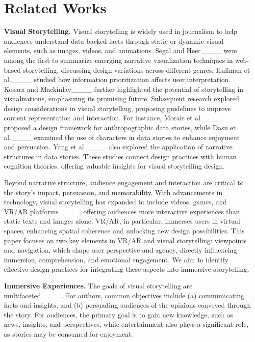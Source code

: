 \section{Related Works}
\noindent\textbf{Visual Storytelling.}
Visual storytelling is widely used in journalism to help audiences understand data-backed facts through static or dynamic visual elements, such as images, videos, and animations.
Segal and Heer____ were among the first to summarize emerging narrative visualization techniques in web-based storytelling, discussing design variations across different genres.
Hullman et al.____ studied how information prioritization affects user interpretation. Kosara and Mackinlay____ further highlighted the potential of storytelling in visualizations, emphasizing its promising future.
Subsequent research explored design considerations in visual storytelling, proposing guidelines to improve content representation and interaction. For instance, Morais et al.____ proposed a design framework for anthropographic data stories, while Dasu et al.____ examined the use of characters in data stories to enhance enjoyment and persuasion. Yang et al.____ also explored the application of narrative structures in data stories. These studies connect design practices with human cognition theories, offering valuable insights for visual storytelling design.

Beyond narrative structure, audience engagement and interaction are critical to the story’s impact, persuasion, and memorability.
With advancements in technology, visual storytelling has expanded to include videos, games, and VR/AR platforms____, offering audiences more interactive experiences than static texts and images alone. VR/AR, in particular, immerses users in virtual spaces, enhancing spatial coherence and unlocking new design possibilities.
This paper focuses on two key elements in VR/AR and visual storytelling: viewpoints and navigation, which shape user perspective and agency, directly influencing immersion, comprehension, and emotional engagement. We aim to identify effective design practices for integrating these aspects into immersive storytelling.

\noindent\textbf{Immersive Experiences.}
The goals of visual storytelling are multifaceted____. For authors, common objectives include (a) communicating facts and insights, and (b) persuading audiences of the opinions conveyed through the story. For audiences, the primary goal is to gain new knowledge, such as news, insights, and perspectives, while entertainment also plays a significant role, as stories may be consumed for enjoyment.

